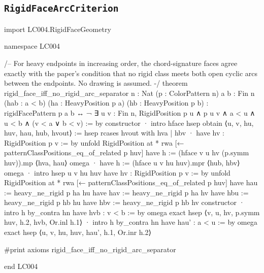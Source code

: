 \documentclass[11pt,reqno]{amsart}
\theoremstyle{definition}
\begin{document}
\subsection{\texorpdfstring{\texttt{RigidFaceArcCriterion}}{RigidFaceArcCriterion}}
\begin{LeanCode}
import LC004.RigidFaceGeometry

namespace LC004

/-- For heavy endpoints in increasing order, the chord-signature faces
agree exactly with the paper's condition that no rigid class meets both
open cyclic arcs between the endpoints. No drawing is assumed. -/
theorem rigid_face_iff_no_rigid_arc_separator {n : Nat} (p : ColorPattern n)
    {a b : Fin n} (hab : a < b)
    (ha : HeavyPosition p a) (hb : HeavyPosition p b) :
    rigidFacePattern p a b ↔
      ¬ ∃ u v : Fin n, RigidPosition p u ∧ p u v ∧
        a < u ∧ u < b ∧ (v < a ∨ b < v) := by
  constructor
  · intro hface hsep
    obtain ⟨u, v, hu, huv, hau, hub, hvout⟩ := hsep
    rcases hvout with hva | hbv
    · have hv : RigidPosition p v := by
        unfold RigidPosition at *
        rwa [← patternClassPositions_eq_of_related p huv]
      have h := (hface v u hv (p.symm huv)).mp ⟨hva, hau⟩
      omega
    · have h := (hface u v hu huv).mpr ⟨hub, hbv⟩
      omega
  · intro hsep u v hu huv
    have hv : RigidPosition p v := by
      unfold RigidPosition at *
      rwa [← patternClassPositions_eq_of_related p huv]
    have hau := heavy_ne_rigid p ha hu
    have hav := heavy_ne_rigid p ha hv
    have hbu := heavy_ne_rigid p hb hu
    have hbv := heavy_ne_rigid p hb hv
    constructor
    · intro h
      by_contra hn
      have hvb : v < b := by omega
      exact hsep ⟨v, u, hv, p.symm huv, h.2, hvb, Or.inl h.1⟩
    · intro h
      by_contra hn
      have hau' : a < u := by omega
      exact hsep ⟨u, v, hu, huv, hau', h.1, Or.inr h.2⟩

#print axioms rigid_face_iff_no_rigid_arc_separator

end LC004
\end{LeanCode}
\end{document}
